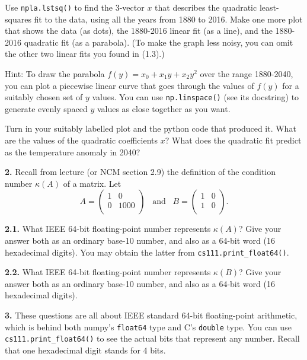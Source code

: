 \documentclass[11pt]{article}
\begin{document}
Use {\tt npla.lstsq()} to find the 3-vector $x$ that describes the quadratic least-squares fit
to the data, using all the years from 1880 to 2016. Make one more plot that shows the data 
(as dots), the 1880-2016 linear fit (as a line), and the 1880-2016 quadratic fit (as a parabola).
(To make the graph less noisy, you can omit the other two linear fits you found in (1.3).)

Hint: To draw the parabola $f(y) = x_0 + x_1y + x_2y^2$ over the range 1880-2040, 
you can plot a piecewise linear curve that goes through the values of $f(y)$ for a
suitably chosen set of $y$ values. You can use {\tt np.linspace()} (see its docstring)
to generate evenly spaced $y$ values as close together as you want.

Turn in your suitably labelled plot and the python code that produced it.
What are the values of the quadratic coefficients $x$? 
What does the quadratic fit predict as the temperature anomaly in 2040?

\par\bigskip
{\bf 2.}
Recall from lecture (or NCM section 2.9) the definition of
the condition number $\kappa(A)$ of a matrix. Let
$$
   A =
   \left(
   \begin{array}{cc}
    1 & 0 \\ 	
    0 & 1000 \\ 
   \end{array} \right)
   \hspace{10pt}
   \mbox{and}
   \hspace{10pt}
   B =
   \left(
   \begin{array}{cc}
    1 & 0 \\ 	
    1 & 0 \\ 
   \end{array} \right).
$$

{\bf 2.1.}
What IEEE 64-bit floating-point number represents $\kappa(A)$?
Give your answer both as an ordinary base-10 number, 
and also as a 64-bit word (16 hexadecimal digits).
You may obtain the latter from {\tt cs111.print\_float64()}.

\par\medskip
{\bf 2.2.}
What IEEE 64-bit floating-point number represents $\kappa(B)$?
Give your answer both as an ordinary base-10 number, 
and also as a 64-bit word (16 hexadecimal digits).

\par\bigskip
{\bf 3.}
These questions are all about IEEE standard 64-bit floating-point arithmetic,
which is behind both numpy's {\tt float64} type and C's {\tt double} type.
You can use {\tt cs111.print\_float64()} to see the actual bits that represent any number.
Recall that one hexadecimal digit stands for 4 bits.
\end{document}
